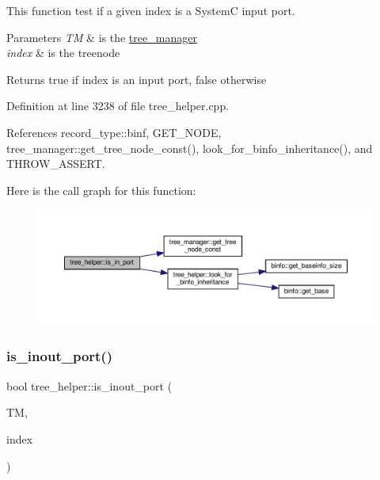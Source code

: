 This function test if a given index is a SystemC input port. 


\begin{DoxyParams}{Parameters}
{\em TM} & is the \hyperlink{classtree__manager}{tree\+\_\+manager} \\
\hline
{\em index} & is the treenode \\
\hline
\end{DoxyParams}
\begin{DoxyReturn}{Returns}
true if index is an input port, false otherwise 
\end{DoxyReturn}


Definition at line 3238 of file tree\+\_\+helper.\+cpp.



References record\+\_\+type\+::binf, G\+E\+T\+\_\+\+N\+O\+DE, tree\+\_\+manager\+::get\+\_\+tree\+\_\+node\+\_\+const(), look\+\_\+for\+\_\+binfo\+\_\+inheritance(), and T\+H\+R\+O\+W\+\_\+\+A\+S\+S\+E\+RT.

Here is the call graph for this function\+:
\nopagebreak
\begin{figure}[H]
\begin{center}
\leavevmode
\includegraphics[width=350pt]{d7/d99/classtree__helper_abb9469aca01d23ad785ffac3b5ce64de_cgraph}
\end{center}
\end{figure}
\mbox{\label{classtree__helper_aca402a84a9a7795074b170a5bc578a69}} 
\subsubsection{\texorpdfstring{is\+\_\+inout\+\_\+port()}{is\_inout\_port()}}
{\footnotesize\ttfamily bool tree\+\_\+helper\+::is\+\_\+inout\+\_\+port (\begin{DoxyParamCaption}\item[{const \hyperlink{tree__manager_8hpp_a792e3f1f892d7d997a8d8a4a12e39346}{tree\+\_\+manager\+Const\+Ref} \&}]{TM,  }\item[{const unsigned int}]{index }\end{DoxyParamCaption})\hspace{0.3cm}{\ttfamily [static]}}



